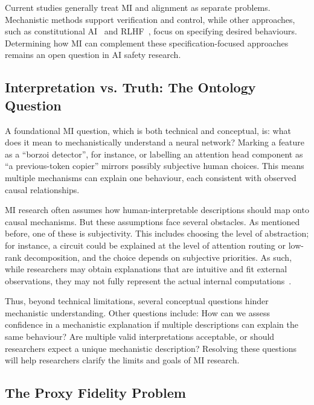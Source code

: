 Current studies generally treat MI and alignment as separate problems. Mechanistic methods support verification and control, while other approaches, such as constitutional AI~ and RLHF~, focus on specifying desired behaviours. Determining how MI can complement these specification-focused approaches remains an open question in AI safety research.

\subsection{Interpretation vs. Truth: The Ontology Question}

\label{sec:ontology}



A foundational MI question, which is both technical and conceptual, is: what does it mean to mechanistically understand a neural network? Marking a feature as a ``borzoi detector'', for instance, or labelling an attention head component as ``a previous-token copier'' mirrors possibly subjective human choices. This means multiple mechanisms can explain one behaviour, each consistent with observed causal relationships.

MI research often assumes how human-interpretable descriptions should map onto causal mechanisms. But these assumptions face several obstacles. As mentioned before, one of these is subjectivity. This includes choosing the level of abstraction; for instance, a circuit could be explained at the level of attention routing or low-rank decomposition, and the choice depends on subjective priorities. As such, while researchers may obtain explanations that are intuitive and fit external observations, they may not fully represent the actual internal computations~.

Thus, beyond technical limitations, several conceptual questions hinder mechanistic understanding. Other questions include: How can we assess confidence in a mechanistic explanation if multiple descriptions can explain the same behaviour? Are multiple valid interpretations acceptable, or should researchers expect a unique mechanistic description? Resolving these questions will help researchers clarify the limits and goals of MI research.

\subsection{The Proxy Fidelity Problem}
\label{sec:proxy-fidelity}















